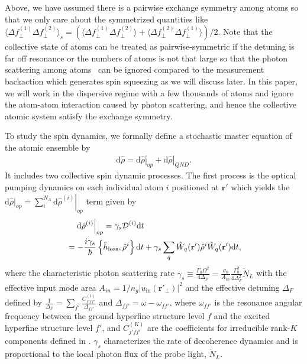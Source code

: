 \documentclass[preprint,aps,pra,onecolumn,superscriptaddress]{revtex4-1} %
\def\br{\mathbf{r}}
\newcommand{\expect}[1]{\big\langle #1 \big\rangle}
\begin{document}
Above, we have assumed there is a pairwise exchange symmetry among atoms so that we only care about the symmetrized quantities like $ \expect{\Delta f_\perp^{(1)}\Delta f_\perp^{(2)}}_s=\left(\expect{\Delta f_\perp^{(1)}\Delta f_\perp^{(2)}} + \expect{\Delta f_\perp^{(2)}\Delta f_\perp^{(1)}} \right)/2 $. 
Note that the collective state of atoms can be treated as pairwise-symmetric if the detuning is far off resonance or the numbers of atoms is not that large so that the photon scattering among atoms~\cite{Asenjo-Garcia2017Atom,Asenjo-Garcia2017Exponential} can be ignored compared to the measurement backaction which generates spin squeezing as we will discuss later.
In this paper, we will work in the dispersive regime with a few thousands of atoms and ignore the atom-atom interaction caused by photon scattering, and hence the collective atomic system satisfy the exchange symmetry. 


To study the spin dynamics, we formally define a stochastic master equation of the atomic ensemble by
\begin{align}\label{eq:totaldrhodt}
\mathrm{d}\hat{\rho}=\left.\mathrm{d}\hat{\rho}\right|_{op} + \left.\mathrm{d}\hat{\rho}\right|_{QND}.
\end{align}
It includes two collective spin dynamic processes. 
The first process is the optical pumping dynamics on each individual atom $i$ positioned at $\br'$ which yields the $\mathrm{d}\hat{\rho}|_{op}=\sum_i^{N_A} \left.\mathrm{d}\hat{\rho}^{(i)}\right|_{op} $ term given by
\begin{align}
&\quad\left.\mathrm{d}\hat{\rho}^{(i)}\right|_{op} =\gamma_s\mathcal{D}^{(i)}\mathrm{d}t\\
&= -\frac{i\gamma_s}{\hbar} \left\{\hat{h}_{\rm loss},\hat{\rho}^{i} \right\}\mathrm{d}t + \gamma_s\sum_q \hat{W}_q(\br')\hat{\rho}^{i}\hat{W}_q(\br')\mathrm{d}t,
\end{align}
where the characteristic photon scattering rate $ \gamma_s\equiv \frac{\Gamma_0\Omega^2}{4\Delta_F}=\frac{\sigma_0}{A_{in}}\frac{\Gamma_0^2}{4\Delta_F^2}\dot{N}_L $ with the effective input mode area $ A_{in}=1/n_g|u_{\mathrm{in}}(\br'\!_\perp)|^2 $ and the effective detuning $ \Delta_F $ defined by $ \frac{1}{\Delta_F}=\sum_{f'}\frac{C_{f'ff'}^{(1)}}{\Delta_{ff'}} $ and $ \Delta_{ff'}=\omega-\omega_{ff'} $, where $ \omega_{ff'} $ is the resonance angular frequency between the ground hyperfine structure level $ f $ and the excited hyperfine structure level $ f' $, and $ C_{j'ff'}^{(K)} $ are the coefficients for irreducible rank-$K$ components defined in \cite{Deutsch2010a}.
$\gamma_s$ characterizes the rate of decoherence dynamics and is proportional to the local photon flux of the probe light, $ \dot{N}_L $.
\end{document}
